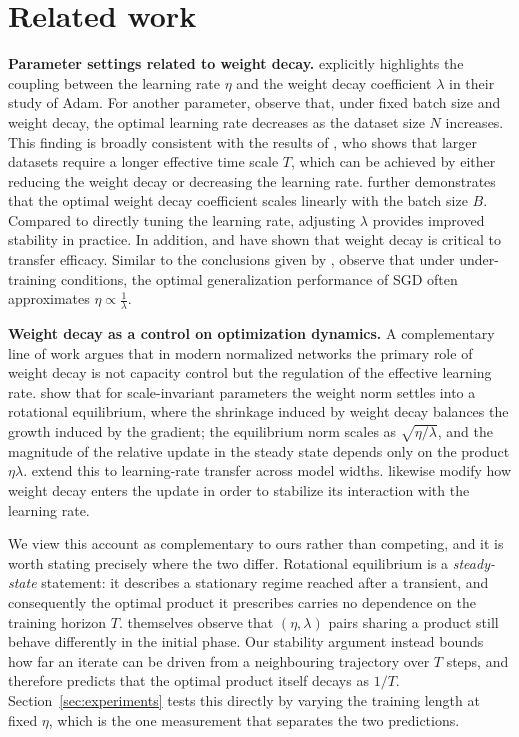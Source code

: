 \section{Related work} 

\textbf{Parameter settings related to weight decay.} 
\citet{Loshchilov2017DecoupledWD} explicitly highlights the coupling between the learning rate $\eta$ and the weight decay coefficient $\lambda$ in their study of Adam. For another parameter, \citet{blake2025umupunitscaledmaximalupdate} observe that, under fixed batch size and weight decay, the optimal learning rate decreases as the dataset size $N$ increases. This finding is broadly consistent with the results of \citet{wang2025setadamwsweightdecay}, who shows that larger datasets require a longer effective time scale $T$, which can be achieved by either reducing the weight decay or decreasing the learning rate. \citet{bergsma2025powerlinesscalinglaws} further demonstrates that the optimal weight decay coefficient scales linearly with the batch size $B$. Compared to directly tuning the learning rate, adjusting $\lambda$ provides improved stability in practice. In addition, \citet{fan2025robustlayerwisescalingrules} and \citet{wang2025setadamwsweightdecay} have shown that weight decay is critical to transfer efficacy. Similar to the conclusions given by \citet{wang2025setadamwsweightdecay}, \citet{dangelo2024needweightdecaymodern} observe that under under-training conditions, the optimal generalization performance of SGD often approximates $\eta \propto \frac{1}{\lambda}$. 

\textbf{Weight decay as a control on optimization dynamics.} A complementary line of work argues that in modern normalized networks the primary role of weight decay is not capacity control but the regulation of the effective learning rate. \citet{kosson2024rotational} show that for scale-invariant parameters the weight norm settles into a rotational equilibrium, where the shrinkage induced by weight decay balances the growth induced by the gradient; the equilibrium norm scales as $\sqrt{\eta/\lambda}$, and the magnitude of the relative update in the steady state depends only on the product $\eta\lambda$. \citet{kosson2025weightdecay} extend this to learning-rate transfer across model widths. \citet{xie2020stable} likewise modify how weight decay enters the update in order to stabilize its interaction with the learning rate.

We view this account as complementary to ours rather than competing, and it is worth stating precisely where the two differ. Rotational equilibrium is a \emph{steady-state} statement: it describes a stationary regime reached after a transient, and consequently the optimal product it prescribes carries no dependence on the training horizon $T$. \citet{kosson2025weightdecay} themselves observe that $(\eta,\lambda)$ pairs sharing a product still behave differently in the initial phase. Our stability argument instead bounds how far an iterate can be driven from a neighbouring trajectory over $T$ steps, and therefore predicts that the optimal product itself decays as $1/T$. Section~\ref{sec:experiments} tests this directly by varying the training length at fixed $\eta$, which is the one measurement that separates the two predictions.

